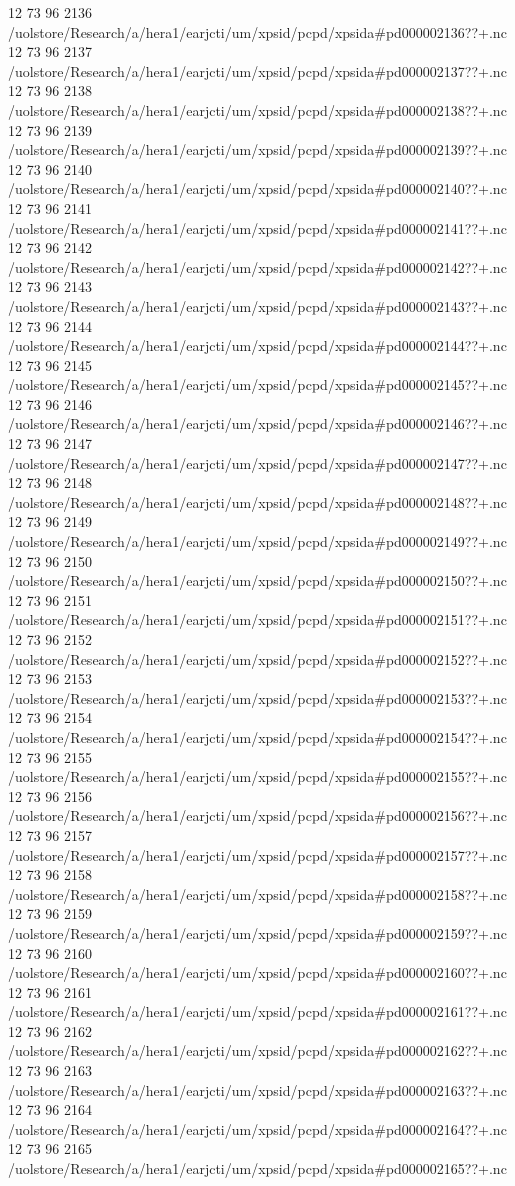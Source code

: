 12 73 96
2136
/uolstore/Research/a/hera1/earjcti/um/xpsid/pcpd/xpsida#pd000002136??+.nc
12 73 96
2137
/uolstore/Research/a/hera1/earjcti/um/xpsid/pcpd/xpsida#pd000002137??+.nc
12 73 96
2138
/uolstore/Research/a/hera1/earjcti/um/xpsid/pcpd/xpsida#pd000002138??+.nc
12 73 96
2139
/uolstore/Research/a/hera1/earjcti/um/xpsid/pcpd/xpsida#pd000002139??+.nc
12 73 96
2140
/uolstore/Research/a/hera1/earjcti/um/xpsid/pcpd/xpsida#pd000002140??+.nc
12 73 96
2141
/uolstore/Research/a/hera1/earjcti/um/xpsid/pcpd/xpsida#pd000002141??+.nc
12 73 96
2142
/uolstore/Research/a/hera1/earjcti/um/xpsid/pcpd/xpsida#pd000002142??+.nc
12 73 96
2143
/uolstore/Research/a/hera1/earjcti/um/xpsid/pcpd/xpsida#pd000002143??+.nc
12 73 96
2144
/uolstore/Research/a/hera1/earjcti/um/xpsid/pcpd/xpsida#pd000002144??+.nc
12 73 96
2145
/uolstore/Research/a/hera1/earjcti/um/xpsid/pcpd/xpsida#pd000002145??+.nc
12 73 96
2146
/uolstore/Research/a/hera1/earjcti/um/xpsid/pcpd/xpsida#pd000002146??+.nc
12 73 96
2147
/uolstore/Research/a/hera1/earjcti/um/xpsid/pcpd/xpsida#pd000002147??+.nc
12 73 96
2148
/uolstore/Research/a/hera1/earjcti/um/xpsid/pcpd/xpsida#pd000002148??+.nc
12 73 96
2149
/uolstore/Research/a/hera1/earjcti/um/xpsid/pcpd/xpsida#pd000002149??+.nc
12 73 96
2150
/uolstore/Research/a/hera1/earjcti/um/xpsid/pcpd/xpsida#pd000002150??+.nc
12 73 96
2151
/uolstore/Research/a/hera1/earjcti/um/xpsid/pcpd/xpsida#pd000002151??+.nc
12 73 96
2152
/uolstore/Research/a/hera1/earjcti/um/xpsid/pcpd/xpsida#pd000002152??+.nc
12 73 96
2153
/uolstore/Research/a/hera1/earjcti/um/xpsid/pcpd/xpsida#pd000002153??+.nc
12 73 96
2154
/uolstore/Research/a/hera1/earjcti/um/xpsid/pcpd/xpsida#pd000002154??+.nc
12 73 96
2155
/uolstore/Research/a/hera1/earjcti/um/xpsid/pcpd/xpsida#pd000002155??+.nc
12 73 96
2156
/uolstore/Research/a/hera1/earjcti/um/xpsid/pcpd/xpsida#pd000002156??+.nc
12 73 96
2157
/uolstore/Research/a/hera1/earjcti/um/xpsid/pcpd/xpsida#pd000002157??+.nc
12 73 96
2158
/uolstore/Research/a/hera1/earjcti/um/xpsid/pcpd/xpsida#pd000002158??+.nc
12 73 96
2159
/uolstore/Research/a/hera1/earjcti/um/xpsid/pcpd/xpsida#pd000002159??+.nc
12 73 96
2160
/uolstore/Research/a/hera1/earjcti/um/xpsid/pcpd/xpsida#pd000002160??+.nc
12 73 96
2161
/uolstore/Research/a/hera1/earjcti/um/xpsid/pcpd/xpsida#pd000002161??+.nc
12 73 96
2162
/uolstore/Research/a/hera1/earjcti/um/xpsid/pcpd/xpsida#pd000002162??+.nc
12 73 96
2163
/uolstore/Research/a/hera1/earjcti/um/xpsid/pcpd/xpsida#pd000002163??+.nc
12 73 96
2164
/uolstore/Research/a/hera1/earjcti/um/xpsid/pcpd/xpsida#pd000002164??+.nc
12 73 96
2165
/uolstore/Research/a/hera1/earjcti/um/xpsid/pcpd/xpsida#pd000002165??+.nc
